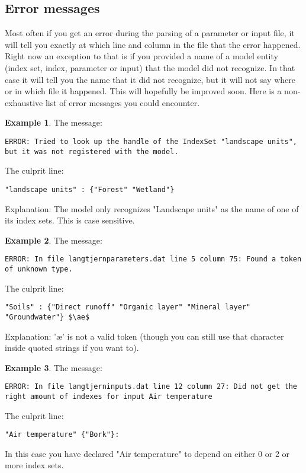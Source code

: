 \documentclass[11pt]{article}
\theoremstyle{definition}
\newtheorem{myexample}{Example}
\newenvironment{example}%
  {\begin{lrbox}{\examplebox}%
   \begin{minipage}{\dimexpr\linewidth-2\fboxsep}
   \begin{myexample}}%
  {\end{myexample}%
   \end{minipage}%
   \end{lrbox}%
   \begin{trivlist}
     \item[]\colorbox{silver}{\usebox\examplebox}
   \end{trivlist}}
\begin{document}
\subsection{Error messages}

Most often if you get an error during the parsing of a parameter or input file, it will tell you exactly at which line and column in the file that the error happened. Right now an exception to that is if you provided a name of a model entity (index set, index, parameter or input) that the model did not recognize. In that case it will tell you the name that it did not recognize, but it will not say where or in which file it happened. This will hopefully be improved soon. Here is a non-exhaustive list of error messages you could encounter.

\begin{example}
The message:
\begin{lstlisting}
ERROR: Tried to look up the handle of the IndexSet "landscape units", but it was not registered with the model.
\end{lstlisting}
The culprit line:
\begin{lstlisting}
"landscape units" : {"Forest" "Wetland"}
\end{lstlisting}
Explanation: The model only recognizes "Landscape units" as the name of one of its index sets. This is case sensitive.
\end{example}

\begin{example}
The message:
\begin{lstlisting}
ERROR: In file langtjernparameters.dat line 5 column 75: Found a token of unknown type.
\end{lstlisting}
The culprit line:
\begin{lstlisting}[mathescape]
"Soils" : {"Direct runoff" "Organic layer" "Mineral layer" "Groundwater"} $\ae$
\end{lstlisting}
Explanation: '\ae' is not a valid token (though you can still use that character inside quoted strings if you want to).
\end{example}

\begin{example}
The message:
\begin{lstlisting}
ERROR: In file langtjerninputs.dat line 12 column 27: Did not get the right amount of indexes for input Air temperature
\end{lstlisting}
The culprit line:
\begin{lstlisting}[mathescape]
"Air temperature" {"Bork"}:
\end{lstlisting}
In this case you have declared "Air temperature" to depend on either 0 or 2 or more index sets.
\end{example}
\end{document}
